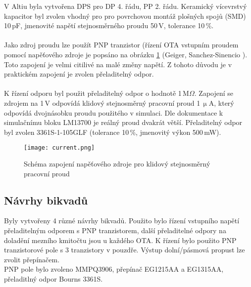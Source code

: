 \noindent V Altiu byla vytvořena DPS pro DP 4. řádu, PP 2. řádu. Keramický vícevrstvý kapacitor byl zvolen vhodný pro pro povrchovou montáž plošných spojů (SMD) 10\,pF, jmenovité napětí stejnosměrného proudu 50\,V, tolerance 10\,\%. \\
\\
Jako zdroj proudu lze použít PNP tranzistor (řízení OTA vstupním proudem pomocí napěťového zdroje je popsáno na obrázku \ref{s:DC} (Geiger, Sanchez-Sinencio \cite{25}). Toto zapojení je velmi citilivé na malé změny napětí. Z tohoto důvodu je v praktickém zapojení je zvolen přeladitelný odpor. \\
\\
K řízení odporu byl použit přeladitelný odpor o hodnotě 1\,M$\Omega$. Zapojení se zdrojem na 1\,V odpovídá klidový stejnosměrný pracovní proud 1\,$\upmu$A, který odpovídá dvojnásobku proudu použitého v simulaci. Dle dokumentace k simulačnímu bloku LM13700 je reálný proud dvakrát větší. Přeladitelný odpor byl zvolen 3361S-1-105GLF (tolerance 10\,\%, jmenovitý výkon 500\,mW). 
\begin{figure}[h]
\centering
\texttt{[image: current.png]}
\caption{Schéma zapojení napěťového zdroje pro klidový stejnosměrný pracovní proud \label{s:DC}}
\end{figure}
\subsection{Návrhy bikvadů}
\noindent Byly vytvořeny 4 různé návrhy bikvadů. Použito bylo řízení vstupního napětí přeladitelným odporem s PNP tranzistorem, další přeladitelné odpory na doladění mezního kmitočtu jsou u každého OTA. K řízení bylo použito PNP tranzistorové pole s 3 tranzistory v pouzdře. Výstup dolní/pásmová propust lze zvolit přepínačem.\\
\noindent PNP pole bylo zvoleno MMPQ3906, přepínač EG1215AA a EG1315AA, přeladitlný odpor Bourns 3361S.